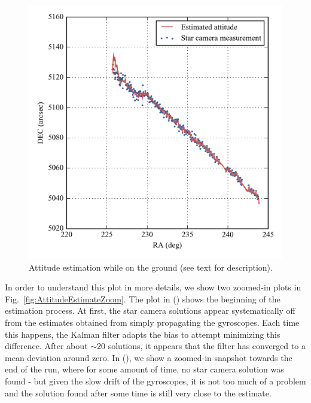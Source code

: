 \begin{figure}[!ht]
\begin{center}
\includegraphics{Figures/attitude_estimate.png}
\caption[Attitude estimation while on the ground]{Attitude estimation while on the ground (see text for description).}
\label{fig:GyroAttitudeEstimate}
\end{center}
\end{figure}

In order to understand this plot in more details, we show two zoomed-in plots in Fig.~\ref{fig:AttitudeEstimateZoom}. The plot in () shows the beginning of the estimation process. At first, the star camera solutions appear systematically off from the estimates obtained from simply propagating the gyroscopes. Each time this happens, the Kalman filter adapts the bias to attempt minimizing this difference. After about $\sim 20$ solutions, it appears that the filter has converged to a mean deviation around zero. In (), we show a zoomed-in snapshot towards the end of the run, where for some amount of time, no star camera solution was found - but given the slow drift of the gyroscopes, it is not too much of a problem and the solution found after some time is still very close to the estimate.

